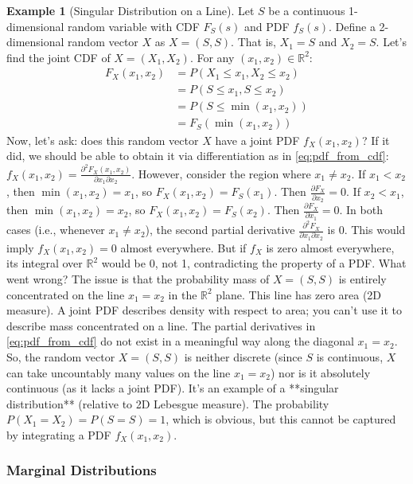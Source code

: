\documentclass[11pt, a4paper]{article}
\theoremstyle{definition} %
\newtheorem{example}[theorem]{Example}
\newcommand{\R}{\mathbb{R}}
\begin{document}
\begin{example}[Singular Distribution on a Line] \label{ex:singular_diagonal}
Let $S$ be a continuous 1-dimensional random variable with CDF $F_S(s)$ and PDF $f_S(s)$. Define a 2-dimensional random vector $X$ as $X = (S, S)$. That is, $X_1 = S$ and $X_2 = S$. Let's find the joint CDF of $X=(X_1, X_2)$.
For any $(x_1, x_2) \in \R^2$:
\begin{align*}
F_X(x_1, x_2) &= P(X_1 \le x_1, X_2 \le x_2) \\
&= P(S \le x_1, S \le x_2) \\
&= P(S \le \min(x_1, x_2)) \\
&= F_S(\min(x_1, x_2)) \label{eq:singular_cdf} \tag{2.3}
\end{align*}
Now, let's ask: does this random vector $X$ have a joint PDF $f_X(x_1, x_2)$? If it did, we should be able to obtain it via differentiation as in \eqref{eq:pdf_from_cdf}: $f_X(x_1, x_2) = \frac{\partial^2 F_X(x_1, x_2)}{\partial x_1 \partial x_2}$.
However, consider the region where $x_1 \ne x_2$.
If $x_1 < x_2$, then $\min(x_1, x_2) = x_1$, so $F_X(x_1, x_2) = F_S(x_1)$. Then $\frac{\partial F_X}{\partial x_2} = 0$.
If $x_2 < x_1$, then $\min(x_1, x_2) = x_2$, so $F_X(x_1, x_2) = F_S(x_2)$. Then $\frac{\partial F_X}{\partial x_1} = 0$.
In both cases (i.e., whenever $x_1 \ne x_2$), the second partial derivative $\frac{\partial^2 F_X}{\partial x_1 \partial x_2}$ is 0.
This would imply $f_X(x_1, x_2) = 0$ almost everywhere. But if $f_X$ is zero almost everywhere, its integral over $\R^2$ would be 0, not 1, contradicting the property of a PDF.
What went wrong? The issue is that the probability mass of $X=(S,S)$ is entirely concentrated on the line $x_1 = x_2$ in the $\R^2$ plane. This line has zero area (2D measure). A joint PDF describes density with respect to area; you can't use it to describe mass concentrated on a line. The partial derivatives in \eqref{eq:pdf_from_cdf} do not exist in a meaningful way along the diagonal $x_1 = x_2$.
So, the random vector $X=(S, S)$ is neither discrete (since $S$ is continuous, $X$ can take uncountably many values on the line $x_1=x_2$) nor is it absolutely continuous (as it lacks a joint PDF). It's an example of a **singular distribution** (relative to 2D Lebesgue measure). The probability $P(X_1 = X_2) = P(S=S) = 1$, which is obvious, but this cannot be captured by integrating a PDF $f_X(x_1, x_2)$.
\end{example}

\subsubsection*{Marginal Distributions}
\end{document}
